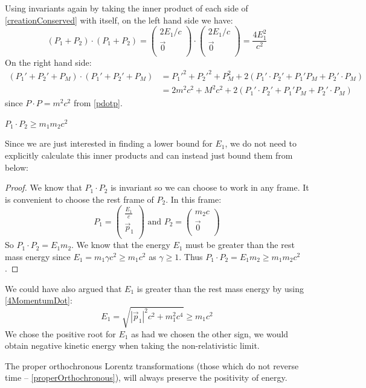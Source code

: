 \documentclass[../main.tex]{subfiles}
\begin{document}
Using invariants again by taking the inner product of each side of \cref{creationConserved} with itself, on the left hand side we have:
\[
  (P_1 + P_2) \cdot (P_1 + P_2) = \begin{pmatrix}
  2E_1/c \\
  \vec{0} \\
  \end{pmatrix} \cdot \begin{pmatrix}
  2E_1/c \\
  \vec{0} \\
  \end{pmatrix} = \frac{4E^2_1}{c^2}
\]
On the right hand side:
\begin{align}
  (P_1' + P_2' + P_M) \cdot (P_1' + P_2' + P_M) &= {P_1'}^2 + {P_2'}^2 + P_M^2 + 2(P_1' \cdot P_2' + P_1' P_M + P_2'\cdot P_M) \nonumber \\
                                                &= 2m^2c^2 + M^2 c^2 + 2(P_1' \cdot P_2' + P_1' P_M + P_2'\cdot P_M) \label{rhsCollision} \tag{$\ast$}
\end{align}
since $P \cdot P = m^2 c^2$ from \cref{pdotp}.
\begin{lemma}
  $P_1 \cdot P_2 \geq m_1m_2c^2$
\end{lemma}
Since we are just interested in finding a lower bound for $E_1$, we do not need to explicitly calculate this inner products and can instead just bound them from below:
\begin{proof}
  We know that $P_1 \cdot P_2$ is invariant so we can choose to work in any frame.
  It is convenient to choose the rest frame of $P_2$.
  In this frame:
  \[
    P_1 = \begin{pmatrix}
    \frac{E_1}{c} \\
    \vec{p}_1 \\
    \end{pmatrix} \text{ and } P_2 = \begin{pmatrix}
    m_2 c \\
    \vec{0} \\
    \end{pmatrix}
  \]
  So $P_1 \cdot P_2 = E_1 m_2$.
  We know that the energy $E_1$ must be greater than the rest mass energy since $E_1 = m_1 \gamma c^2 \geq m_1 c^2$ as $\gamma \geq 1$.
  Thus $P_1 \cdot P_2 = E_1m_2 \geq m_1m_2 c^2$.
\end{proof}
\begin{remark}[Note]
  We could have also argued that $E_1$ is greater than the rest mass energy by using \cref{4MomentumDot}:
  \[
    E_1 = \sqrt{|\vec{p}_1|^2 c^2 + m_1^2 c^4} \geq m_1 c^2
  \]
  We chose the positive root for $E_1$ as had we chosen the other sign, we would obtain negative kinetic energy when taking the non-relativistic limit.

  The proper orthochronous Lorentz transformations (those which do not reverse time -- \cref{properOrthochronous}), will always preserve the positivity of energy.
\end{remark}
\end{document}
